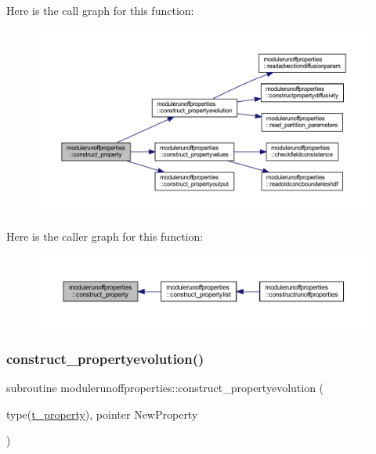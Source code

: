 Here is the call graph for this function\+:\nopagebreak
\begin{figure}[H]
\begin{center}
\leavevmode
\includegraphics[width=350pt]{namespacemodulerunoffproperties_aca58b5228ca3591f05eb014b1b370a57_cgraph}
\end{center}
\end{figure}
Here is the caller graph for this function\+:\nopagebreak
\begin{figure}[H]
\begin{center}
\leavevmode
\includegraphics[width=350pt]{namespacemodulerunoffproperties_aca58b5228ca3591f05eb014b1b370a57_icgraph}
\end{center}
\end{figure}
\mbox{\label{namespacemodulerunoffproperties_aa934a2b16151c8ba36343b555f143da8}} 
\subsubsection{\texorpdfstring{construct\+\_\+propertyevolution()}{construct\_propertyevolution()}}
{\footnotesize\ttfamily subroutine modulerunoffproperties\+::construct\+\_\+propertyevolution (\begin{DoxyParamCaption}\item[{type(\mbox{\hyperlink{structmodulerunoffproperties_1_1t__property}{t\+\_\+property}}), pointer}]{New\+Property }\end{DoxyParamCaption})\hspace{0.3cm}{\ttfamily [private]}}


